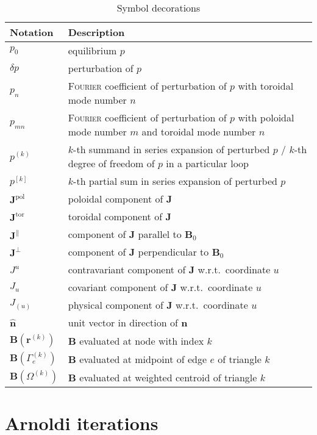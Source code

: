 \documentclass[a4paper, twoside, 10pt, english]{article}
\numberwithin{equation}{section}
\let\vec\symbf
\newcommand*\pol{\ensuremath{\textrm{pol}}}  %
\newcommand*\tor{\ensuremath{\textrm{tor}}}  %
\begin{document}
\begin{longtable}{l >{\RaggedRight}p{}}
  \caption{Symbol decorations} \\
  \toprule
  \textbf{Notation} & \textbf{Description} \\
  \midrule
  \endhead
  \label{tab:decorations}%
  $p_{0}$ & equilibrium $p$ \\
  $\delta p$ & perturbation of $p$ \\
  $p_{n}$ & \textsc{Fourier} coefficient of perturbation of $p$ with toroidal mode number $n$ \\
  $p_{m n}$ & \textsc{Fourier} coefficient of perturbation of $p$ with poloidal mode number $m$ and toroidal mode number $n$ \\
  $p^{(k)}$ & $k$-th summand in series expansion of perturbed $p$ / $k$-th degree of freedom of $p$ in a particular loop \\
  $p^{[k]}$ & $k$-th partial sum in series expansion of perturbed $p$ \\
  \midrule
  $\vec{J}^{\pol}$ & poloidal component of $\vec{J}$ \\
  $\vec{J}^{\tor}$ & toroidal component of $\vec{J}$ \\
  $\vec{J}^{\parallel}$ & component of $\vec{J}$ parallel to $\vec{B}_{0}$ \\
  $\vec{J}^{\perp}$ & component of $\vec{J}$ perpendicular to $\vec{B}_{0}$ \\
  $J^{u}$ & contravariant component of $\vec{J}$ w.r.t.\ coordinate $u$ \\
  $J_{u}$ & covariant component of $\vec{J}$ w.r.t.\ coordinate $u$ \\
  $J_{(u)}$ & physical component of $\vec{J}$ w.r.t.\ coordinate $u$ \\
  $\hat{\vec{n}}$ & unit vector in direction of $\vec{n}$ \\
  \midrule
  $\vec{B} (\vec{r}^{(k)})$ & $\vec{B}$ evaluated at node with index $k$ \\
  $\vec{B} (\Gamma_{e}^{(k)})$ & $\vec{B}$ evaluated at midpoint of edge $e$ of triangle $k$ \\
  $\vec{B} (\Omega^{(k)})$ & $\vec{B}$ evaluated at weighted centroid of triangle $k$ \\
  \bottomrule
\end{longtable}

\section{Arnoldi iterations}
\label{app:Arnoldi}
\end{document}
